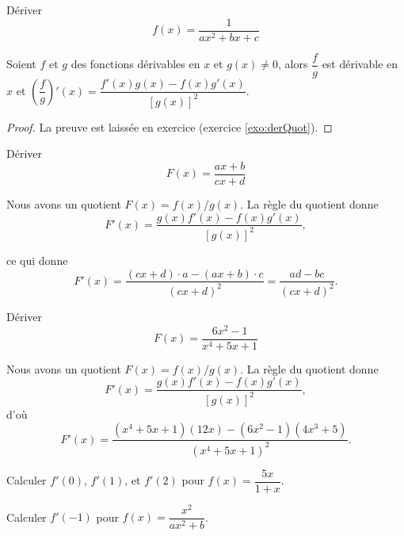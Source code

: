 \documentclass[a4paper,12pt]{article}
\begin{document}
\begin{exemple}
	\tcblower
	Dériver 
	\[f(x)=\dfrac{1}{ax^2+bx+c}\]
	\vspace{6cm}
\end{exemple}
\begin{prop}[label=prop:derQuot]
   \tcblower
   Soient $f$ et $g$ des fonctions dérivables en $x$ et $g(x)\neq 0$, alors $\dfrac{f}{g}$ est dérivable en $x$ et $\left(\dfrac{f}{g}\right)'(x)=\dfrac{f'(x)g(x)-f(x)g'(x)}{[g(x)]^2}$. 
   \medskip

   \begin{proof}
	   La preuve est laissée en exercice (exercice \ref{exo:derQuot}).
   \end{proof}
\end{prop}

\begin{exemple}
   \tcblower
  Dériver 
   $$F(x) = \frac{ax+b}{cx+d}$$
   
Nous avons un quotient $F(x) = f(x)/g(x)$. La règle du quotient donne
   $$F'(x) = \frac{g(x)f'(x) - f(x)g'(x)}{[g(x)]^2},$$
   
   ce qui donne
   $$F'(x) = \frac{(cx+d) \cdot a - (ax+b) \cdot c}{(cx+d)^2} = \frac{ad - bc}{(cx+d)^2}.$$
\end{exemple}
\begin{exemple}
	\tcblower
Dériver	
	$$F(x) = \frac{6x^2 - 1}{x^4 + 5x + 1}$$
	
Nous avons un quotient $F(x) = f(x)/g(x)$. La règle du quotient donne
	$$F'(x) = \frac{g(x)f'(x) - f(x)g'(x)}{[g(x)]^2},$$
	d'où
	$$F'(x) = \frac{(x^4 + 5x + 1)(12x) - (6x^2 - 1)(4x^3 + 5)}{(x^4 + 5x + 1)^2}.$$
\end{exemple}
\begin{exemple}
	\tcblower
	Calculer $f'(0)$, $f'(1)$, et $f'(2)$ pour $f(x) = \dfrac{5x}{1+x}$.
	
	\vspace{5cm}

\end{exemple}
\begin{exemple}
	\tcblower
	Calculer $f'(-1)$ pour $f(x) = \dfrac{x^2}{ax^2 + b}$.
	
	\vspace{5.5cm}
\end{exemple}
\end{document}
